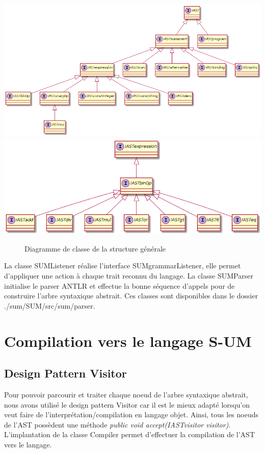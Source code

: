 \documentclass[a4paper,12pt]{report}
\begin{document}
\begin{center}
 \includegraphics[scale=0.55]{./plantuml/ast_general_structure.png}
 \includegraphics[scale=0.70]{./plantuml/ast_binop_structure.png}
 \begin{figure}
  \caption{Diagramme de classe de la structure générale}
 \end{figure}
\end{center}

La classe SUMListener réalise l'interface SUMgrammarListener, elle
permet d'appliquer une action à chaque trait reconnu du langage. La classe SUMParser
initialise le parser ANTLR et effectue la bonne séquence d'appels pour de construire l'arbre syntaxique abstrait.
Ces classes sont disponibles dans le dossier ./sum/SUM/src/sum/parser.

\section{Compilation vers le langage S-UM}
\subsection{Design Pattern Visitor}
Pour pouvoir parcourir et traiter chaque noeud de l'arbre syntaxique abstrait, nous avons utilisé le design pattern Visitor car il est
le mieux adapté lorsqu'on veut faire de l'interprétation/compilation en langage objet. Ainsi, tous les noeuds de l'AST possèdent
une méthode \textit{public void accept(IASTvisitor visitor)}. L'implantation de la classe Compiler permet d'effectuer la compilation de l'AST vers le langage.
\end{document}
